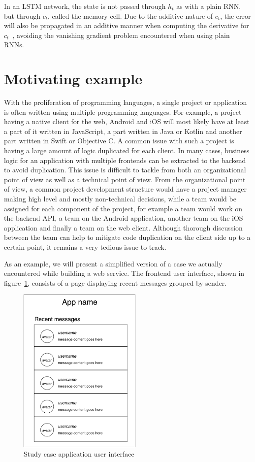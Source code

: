 In an LSTM network, the state is not passed through $h_t$ as with a plain RNN,
but through $c_t$, called the memory cell. Due to the additive nature of $c_t$,
the error will also be propagated in an additive manner when computing the
derivative for $c_t$~\cite{Hochreiter:1997:LSM:1246443.1246450}, avoiding the
vanishing gradient problem encountered when using plain RNNs.
%
\section{Motivating example}
With the proliferation of programming languages, a single project or application
is often written using multiple programming languages. For example, a project
having a native client for the web, Android and iOS will most likely have at
least a part of it written in JavaScript, a part written in Java or Kotlin and
another part written in Swift or Objective C. A common issue with such a project
is having a large amount of logic duplicated for each client. In many cases,
business logic for an application with multiple frontends can be extracted to
the backend to avoid duplication. This issue is difficult to tackle from both an
organizational point of view as well as a technical point of view.
From the organizational point of view, a common project development structure
would have a project manager making high level and mostly non-technical
decisions, while a team would be assigned for each component of the project, for
example a team would work on the backend API, a team on the Android application,
another team on the iOS application and finally a team on the web client.
Although thorough discussion between the team can help to mitigate code
duplication on the client side up to a certain point, it remains a very tedious
issue to track.

As an example, we will present a simplified version of a case we actually
encountered while building a web service. The frontend user interface, shown in
figure~\ref{fig:app-messages-screen}, consists of a page displaying recent
messages grouped by sender.

\begin{figure}[tb]
  \centering\includegraphics[width=6cm]{./images/app-messages-screen.pdf}
  \caption{\label{fig:app-messages-screen} Study case application user interface}
\end{figure}

